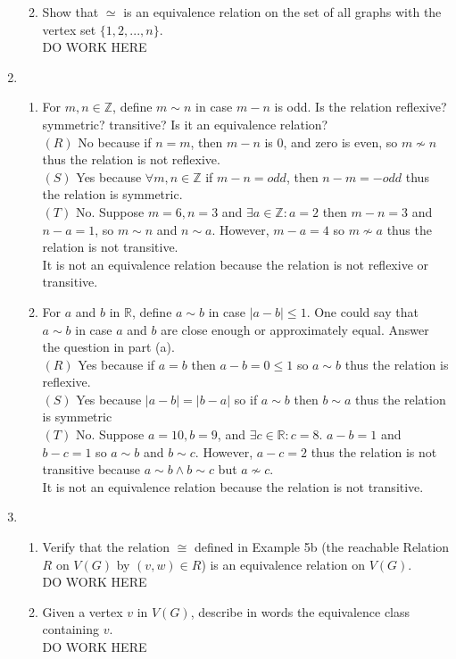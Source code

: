 \documentclass[11pt]{article}
\newcommand{\R}{\mathbb{R}}
\newcommand{\Z}{\mathbb{Z}}
\begin{document}
\begin{enumerate}
\begin{enumerate}
	\item Show that $\simeq$ is an equivalence relation on the set of all graphs with the vertex set $\{1,2,...,n\}$.\\
	DO WORK HERE
	\end{enumerate}
\setcounter{enumi}{7}
\item
	\begin{enumerate}
	\item For $m,n\in\Z$, define $m\sim n$ in case $m-n$ is odd. Is the relation reflexive? symmetric? transitive? Is it an 
	equivalence relation?\\
	$(R)$ No because if $n=m$, then $m-n$ is 0, and zero is even, so $m\not\sim n$ thus the relation is not 
	reflexive.\\
	$(S)$ Yes because $\forall m,n\in\Z$ if $m-n=odd$, then $n-m=-odd$ thus the relation is symmetric.\\
	$(T)$ No. Suppose $m=6,n=3$ and $\exists a\in\Z:a=2$ then $m-n=3$ and $n-a=1$, so $m\sim n$ and $n\sim a$. However, 
	$m-a=4$ so $m\not\sim a$ thus the relation is not transitive.\\
	It is not an equivalence relation because the relation is not reflexive or transitive.
	\item For $a$ and $b$ in $\R$, define $a\sim b$ in case $|a-b|\leq 1$. One could say that $a\sim b$ in case $a$ and $b$ are 
	close enough or approximately equal. Answer the question in part (a).\\
	$(R)$ Yes because if $a=b$ then $a-b=0\leq1$ so $a\sim b$ thus the relation is reflexive.\\
	$(S)$ Yes because $|a-b|=|b-a|$ so if $a\sim b$ then $b\sim a$ thus the relation is symmetric\\
	$(T)$ No. Suppose $a=10,b=9$, and $\exists c\in\R:c=8$. $a-b=1$ and $b-c=1$ so $a\sim b$ and $b\sim c$. However, $a-c=2$ thus 	the relation is not transitive because $a\sim b\wedge b\sim c$ but $a\not\sim c$.\\
	It is not an equivalence relation because the relation is not transitive.
	\end{enumerate}
\setcounter{enumi}{16}
\item 
	\begin{enumerate}
	\item Verify that the relation $\cong$ defined in Example 5b (the reachable Relation $R$ on $V(G)$ by $(v,w)\in R$) is an 
	equivalence relation on $V(G)$.\\
	DO WORK HERE
	\item Given a vertex $v$ in $V(G)$, describe in words the equivalence class containing $v$.\\
	DO WORK HERE
	\end{enumerate}
\end{enumerate}
\end{document}
